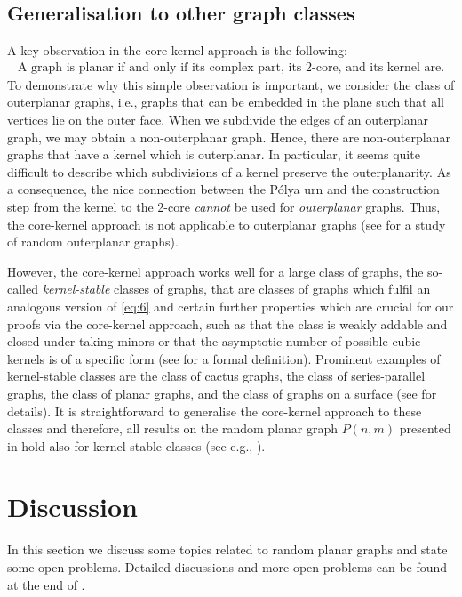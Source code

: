\subsection{Generalisation to other graph classes}\label{sub:other_classes}
A key observation in the core-kernel approach is the following:
\begin{align}\label{eq:6}
    \text{A graph is planar if and only if its complex part, its 2-core, and its kernel are.}
\end{align}
To demonstrate why this simple observation is important, we consider the class of outerplanar graphs, i.e., graphs that can be embedded in the plane such that all vertices lie on the outer face. When we subdivide the edges of an outerplanar graph, we may obtain a non-outerplanar graph. Hence, there are non-outerplanar graphs that have a kernel which is outerplanar. In particular, it seems quite difficult to describe which subdivisions of a kernel preserve the outerplanarity. As a consequence, the nice connection between the P\'olya urn and the construction step from the kernel to the 2-core {\em cannot} be used for {\em outerplanar} graphs. Thus, the core-kernel approach is not applicable to outerplanar graphs (see \cite{KangMissethan2020} for a study of random outerplanar graphs).

However, the core-kernel approach works well for a large class of graphs, the so-called {\em kernel-stable} classes of graphs, that are classes of graphs which fulfil an analogous version of \eqref{eq:6} and certain further properties which are crucial for our proofs via the core-kernel approach, such as that the class is weakly addable and closed under taking minors or that the asymptotic number of possible cubic kernels is of a specific form (see  for a formal definition). Prominent examples of kernel-stable classes are the class of cactus graphs, the class of series-parallel graphs, the class of planar graphs, and the class of graphs on a surface (see  for details). It is straightforward to generalise the core-kernel approach to these classes and therefore, all results on the random planar graph $P(n,m)$ presented in  hold also for kernel-stable classes (see e.g., ).


\section{Discussion}\label{sec:discussion}
In this section we discuss some topics related to random planar graphs and state some open problems. Detailed discussions and more open problems can be found at the end of .


